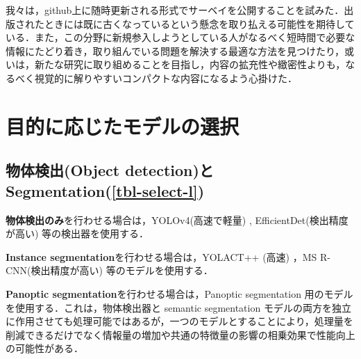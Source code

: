 \documentclass[originalpaper,fleqn]{jsaiart}     %
\begin{document}
我々は，github上に随時更新される形式でサーベイを公開することを試みた．出版されたときには既に古くなっているという懸念を取り払える可能性を期待している．また，この分野に新規参入しようとしている人がなるべく短時間で必要な情報にたどり着き，取り組んでいる問題を解決する最適な方法を見つけたり，或いは，新たな研究に取り組めることを目指し，内容の拡充性や緻密性よりも，なるべく視覚的に解りやすいコンパクトな内容になるよう心掛けた．

\section{目的に応じたモデルの選択}
\subsection{物体検出(Object detection)と Segmentation(\ref{tbl-select-l})}
{\bf 物体検出のみ}を行わせる場合は，YOLOv4(高速で軽量) \cite{BWL20}, EfficientDet(検出精度が高い) \cite{TPL20}等の検出器を使用する．

{\bf Instance segmentation}を行わせる場合は，YOLACT++ (高速) \cite{BZXL20}，MS R-CNN(検出精度が高い) \cite{HHGHW19} 等のモデルを使用する．

{\bf Panoptic segmentation}を行わせる場合は，Panoptic segmentation 用のモデル\cite{KHGRD19}を使用する．これは，物体検出器と semantic segmentation モデルの両方を独立に作用させても処理可能ではあるが，一つのモデルとすることにより，処理量を削減できるだけでなく情報量の増加や共通の特徴量の影響の相乗効果で性能向上の可能性がある．
\end{document}
